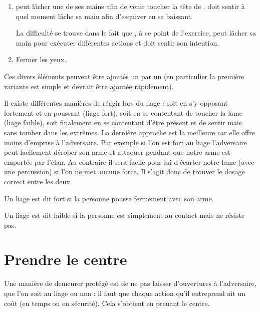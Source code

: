 \begin{exercice}
\begin{enumerate}
		\item \A peut lâcher une de ses mains afin de venir toucher la tête de \D.
		\D doit sentir à quel moment \A lâche sa main afin d'esquiver en se baissant.
		
		La difficulté se trouve dans le fait que \A, à ce point de l'exercice, \A peut lâcher sa main pour exécuter différentes actions et \D doit sentir son intention.
		
		\item Fermer les yeux.
	\end{enumerate}
	Ces divers éléments peuvent être ajoutés un par un (en particulier la première variante est simple et devrait être ajoutée rapidement).

\end{exercice}


Il existe différentes manières de réagir lors du liage : soit en s'y opposant fortement et en poussant (liage fort), soit en se contentant de toucher la lame (liage faible), soit finalement en se contentant d'être présent et de sentir mais sans tomber dans les extrêmes.
La dernière approche est la meilleure car elle offre moins d'emprise à l'adversaire.
Par exemple si l'on est fort au liage l'adversaire peut facilement dérober son arme et attaquer pendant que notre arme est emportée par l'élan.
Au contraire il sera facile pour lui d'écarter notre lame (avec une percussion) si l'on ne met aucune force.
Il s'agit donc de trouver le dosage correct entre les deux.


\begin{definition}

	Un liage est dit fort si la personne pousse fermement avec son arme.
\end{definition}


\begin{definition}

	Un liage est dit faible si la personne est simplement au contact mais ne résiste pas.
\end{definition}


\section{Prendre le centre}


Une manière de demeurer protégé est de ne pas laisser d'ouvertures à l'adversaire, que l'on soit au liage ou non : il faut que chaque action qu'il entreprend ait un coût (en temps ou en sécurité).
Cela s'obtient en prenant le centre.

